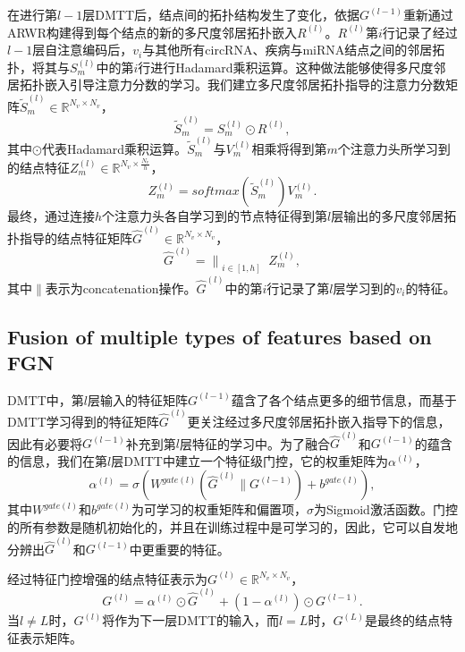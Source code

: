 \documentclass{bioinfo}
\begin{document}
\begin{methods}
在进行第$l-1$层DMTT后，结点间的拓扑结构发生了变化，依据$G^{(l - 1)}$重新通过ARWR构建得到每个结点的新的多尺度邻居拓扑嵌入$R^{(l)}$。$R^{(l)}$第$i$行记录了经过$l-1$层自注意编码后，$v_i$与其他所有circRNA、疾病与miRNA结点之间的邻居拓扑，将其与$S_{m}^{(l)}$中的第$i$行进行Hadamard乘积运算。这种做法能够使得多尺度邻居拓扑嵌入引导注意力分数的学习。我们建立多尺度邻居拓扑指导的注意力分数矩阵$\widetilde{S}_{m}^{(l)} \in \mathbb{R}^{N_v \times N_v}$，
\begin{equation}
	\widetilde{S}_{m}^{(l)} = S_{m}^{(l)}\odot R^{(l)},
\end{equation}
其中$\odot$代表Hadamard乘积运算。$\widetilde{S}_{m}^{(l)}$与$V_{m}^{(l)}$相乘将得到第$m$个注意力头所学习到的结点特征${Z_{m}^{(l)}} \in \mathbb{R}^{N_v \times \frac{N_v}{h}}$，
\begin{equation}
	{Z_{m}^{(l)}} = softmax(\widetilde{S}_{m}^{(l)})V_{m}^{(l)}.
\end{equation}
最终，通过连接$h$个注意力头各自学习到的节点特征得到第$l$层输出的多尺度邻居拓扑指导的结点特征矩阵$\hat{G}^{(l)} \in \mathbb{R}^{N_v \times N_v}$，
\begin{equation}
	\hat{G}^{(l)}= \bigg\|_{\substack{i\in {[1,h]}}} Z^{(l)}_{m},
\end{equation}
其中$\|$表示为concatenation操作。$\hat{G}^{(l)}$中的第$i$行记录了第$l$层学习到的$v_i$的特征。


\subsection{Fusion of multiple types of features based on FGN}
DMTT中，第$l$层输入的特征矩阵${G}^{(l - 1)}$蕴含了各个结点更多的细节信息，而基于DMTT学习得到的特征矩阵$\hat{G}^{(l)}$更关注经过多尺度邻居拓扑嵌入指导下的信息，因此有必要将${G}^{(l - 1)}$补充到第$l$层特征的学习中。为了融合$\hat{G}^{(l)}$和$G^{(l - 1)}$的蕴含的信息，我们在第$l$层DMTT中建立一个特征级门控，它的权重矩阵为$\alpha^{(l)}$，
\begin{equation}
	\alpha^{(l)} = \sigma (W^{gate(l)}(\hat{G}^{(l)}\| G^{(l - 1)}) + b^{gate(l)}),
\end{equation}
其中$W^{gate(l)}$和$b^{gate(l)}$为可学习的权重矩阵和偏置项，$\sigma$为Sigmoid激活函数。门控的所有参数是随机初始化的，并且在训练过程中是可学习的，因此，它可以自发地分辨出$\hat{G}^{(l)}$和$G^{(l - 1)}$中更重要的特征。

经过特征门控增强的结点特征表示为${G}^{(l)} \in \mathbb{R}^{N_v \times N_v}$，
\begin{equation}
	{G}^{(l)} =  \alpha^{(l)} \odot \hat{G}^{(l)} + (1 - \alpha^{(l)}) \odot G^{(l - 1)}.
\end{equation}
当$l \neq  L$时，$G^{(l)}$将作为下一层DMTT的输入，而$l = L$时，$G^{(L)}$是最终的结点特征表示矩阵。



\end{methods}
\end{document}
